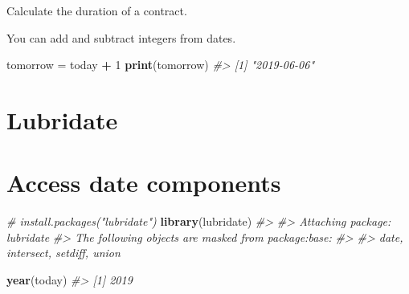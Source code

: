 \documentclass[
]{book}
\newenvironment{Shaded}{\begin{snugshade}}{\end{snugshade}}
\newcommand{\CommentTok}[1]{\textcolor[rgb]{0.56,0.35,0.01}{\textit{#1}}}
\newcommand{\DecValTok}[1]{\textcolor[rgb]{0.00,0.00,0.81}{#1}}
\newcommand{\FunctionTok}[1]{\textcolor[rgb]{0.13,0.29,0.53}{\textbf{#1}}}
\newcommand{\NormalTok}[1]{#1}
\newcommand{\OtherTok}[1]{\textcolor[rgb]{0.56,0.35,0.01}{#1}}
\newcommand{\SpecialCharTok}[1]{\textcolor[rgb]{0.81,0.36,0.00}{\textbf{#1}}}
\begin{document}
Calculate the duration of a contract.

\begin{Shaded}
\end{Shaded}

You can add and subtract integers from dates.

\begin{Shaded}
\begin{Highlighting}[]
\NormalTok{tomorrow }\OtherTok{=}\NormalTok{ today }\SpecialCharTok{+} \DecValTok{1}
\FunctionTok{print}\NormalTok{(tomorrow)}
\CommentTok{\#\textgreater{} [1] "2019{-}06{-}06"}
\end{Highlighting}
\end{Shaded}

\section*{Lubridate}\label{lubridate}

\section{Access date components}\label{access-date-components}

\begin{Shaded}
\begin{Highlighting}[]
\CommentTok{\# install.packages("lubridate")}
\FunctionTok{library}\NormalTok{(lubridate)}
\CommentTok{\#\textgreater{} }
\CommentTok{\#\textgreater{} Attaching package: \textquotesingle{}lubridate\textquotesingle{}}
\CommentTok{\#\textgreater{} The following objects are masked from \textquotesingle{}package:base\textquotesingle{}:}
\CommentTok{\#\textgreater{} }
\CommentTok{\#\textgreater{}     date, intersect, setdiff, union}
\end{Highlighting}
\end{Shaded}

\begin{Shaded}
\begin{Highlighting}[]
\FunctionTok{year}\NormalTok{(today)}
\CommentTok{\#\textgreater{} [1] 2019}
\end{Highlighting}
\end{Shaded}
\end{document}
